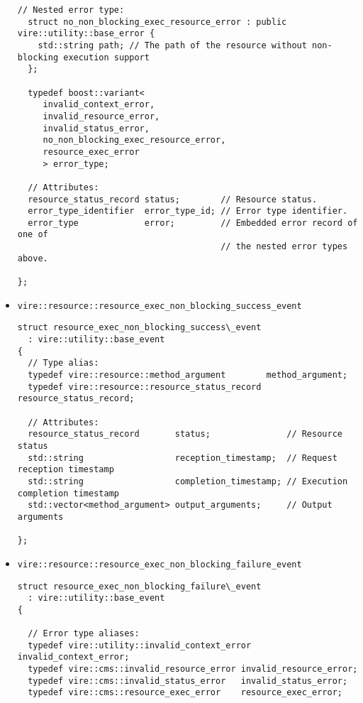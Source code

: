 \begin{itemize}
\begin{Verbatim}[frame=single,xleftmargin=0.cm,label=\fbox{C++}]
  // Nested error type:
  struct no_non_blocking_exec_resource_error : public vire::utility::base_error {
    std::string path; // The path of the resource without non-blocking execution support
  };

  typedef boost::variant<
     invalid_context_error,
     invalid_resource_error,
     invalid_status_error,
     no_non_blocking_exec_resource_error,
     resource_exec_error
     > error_type;

  // Attributes:
  resource_status_record status;        // Resource status.
  error_type_identifier  error_type_id; // Error type identifier.
  error_type             error;         // Embedded error record of one of
                                        // the nested error types above.

};
\end{Verbatim}
\normalsize


\item \texttt{vire::resource::resource\_exec\_non\_blocking\_success\_event}


\small
\begin{Verbatim}[frame=single,xleftmargin=0.cm,label=\fbox{C++}]
struct resource_exec_non_blocking_success\_event
  : vire::utility::base_event
{
  // Type alias:
  typedef vire::resource::method_argument        method_argument;
  typedef vire::resource::resource_status_record resource_status_record;

  // Attributes:
  resource_status_record       status;               // Resource status
  std::string                  reception_timestamp;  // Request reception timestamp
  std::string                  completion_timestamp; // Execution completion timestamp
  std::vector<method_argument> output_arguments;     // Output arguments

};
\end{Verbatim}
\normalsize

\item \texttt{vire::resource::resource\_exec\_non\_blocking\_failure\_event}


\small
\begin{Verbatim}[frame=single,xleftmargin=0.cm,label=\fbox{C++}]
struct resource_exec_non_blocking_failure\_event
  : vire::utility::base_event
{

  // Error type aliases:
  typedef vire::utility::invalid_context_error   invalid_context_error;
  typedef vire::cms::invalid_resource_error invalid_resource_error;
  typedef vire::cms::invalid_status_error   invalid_status_error;
  typedef vire::cms::resource_exec_error    resource_exec_error;


\end{Verbatim}
\end{itemize}

